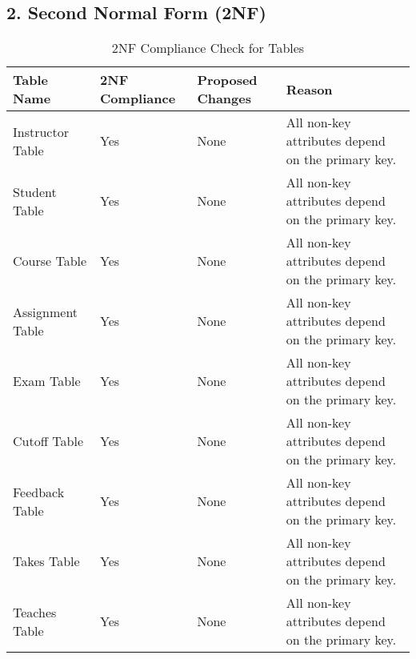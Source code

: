 \documentclass[12pt]{article}
\begin{document}
\subsection*{2. Second Normal Form (2NF)}
\begin{table}[ht]
    \centering
    \begin{tabularx}{\textwidth}{|X|X|X|X|}
        \hline
        \textbf{Table Name} & \textbf{2NF Compliance} & \textbf{Proposed Changes} & \textbf{Reason} \\
        \hline
        Instructor Table & Yes & None & All non-key attributes depend on the primary key. \\
        \hline
        Student Table & Yes & None & All non-key attributes depend on the primary key. \\
        \hline
        Course Table & Yes & None & All non-key attributes depend on the primary key. \\
        \hline
        Assignment Table & Yes & None & All non-key attributes depend on the primary key. \\
        \hline
        Exam Table & Yes & None & All non-key attributes depend on the primary key. \\
        \hline
        Cutoff Table & Yes & None & All non-key attributes depend on the primary key. \\
        \hline
        Feedback Table & Yes & None & All non-key attributes depend on the primary key. \\
        \hline
        Takes Table & Yes & None & All non-key attributes depend on the primary key. \\
        \hline
        Teaches Table & Yes & None & All non-key attributes depend on the primary key. \\
        \hline
    \end{tabularx}
    \caption{2NF Compliance Check for Tables}
    \label{tab:2nf_compliance}
\end{table}


\pagebreak
\end{document}
